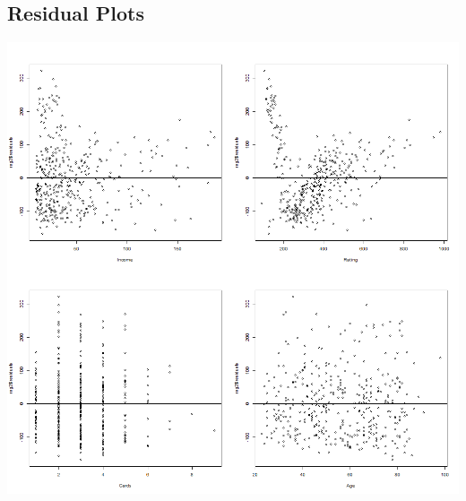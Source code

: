 \documentclass[11pt]{article}
\begin{document}
{\centering
\subsection*{Residual Plots}
\includegraphics[scale=0.45]{Residual Plots}


}
\end{document}
